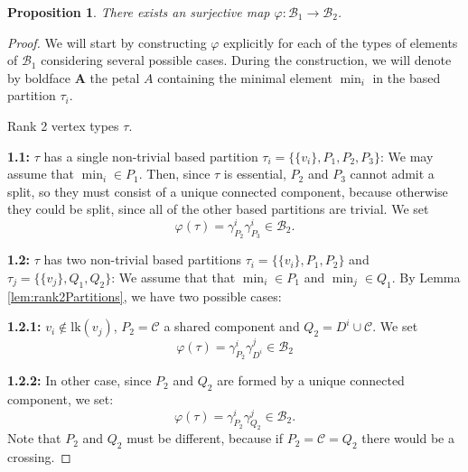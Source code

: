 \documentclass[a4paper]{amsart}
\newcommand{\B}{\mathcal{B}}
\newcommand{\C}{\mathcal{C}}
\newcommand{\lk}{\mathrm{lk}}
\newtheorem{prop}[teo]{Proposition}
\theoremstyle{definition}
\theoremstyle{remark}
\begin{document}
\begin{prop}
    There exists an surjective map   $\varphi: \B_1\rightarrow\B_2$. \label{prop:baseIsomor}
\end{prop}
\begin{proof}
We will start by  constructing $\varphi$ explicitly for each of the types of elements of $\B_1$ considering several possible cases. During the construction, we will denote by boldface  $\boldsymbol{A}$ the petal $A$ containing the minimal element $\min_i$ in the based partition $\tau_i$. 

     Rank 2 vertex types $\tau$.

     {\textbf{1.1:}} $\tau$ has a single non-trivial based partition $\tau_i=\{\{v_i\},P_1,P_2,P_3\}$:  We may assume that  $\min_i\in P_1$. Then, since $\tau$ is essential, $P_2$ and $P_3$ cannot admit a split, so they must consist of a unique connected component, because otherwise they could be split, since all of the other based partitions are trivial. We set 
        $$
        \varphi(\tau)= \gamma^i_{P_2}\gamma^i_{P_3}\in\B_2.
        $$

     
     {\textbf{1.2:}} $\tau$ has two non-trivial based partitions $\tau_i=\{\{v_i\},P_1,P_2\}$ and $\tau_j=\{\{v_j\},Q_1,Q_2\}$:
     We  assume that that $\min_i\in P_1$ and $\min_j\in Q_1$. By Lemma \ref{lem:rank2Partitions}, we have two possible cases:
        
         {\textbf{1.2.1:}}  $v_i\notin \lk(v_j)$, $P_2=\C$ a shared component and $Q_2=D^i\cup\C$. We set
         $$\varphi(\tau)= \gamma^i_{P_2}\gamma^j_{D^i}\in\B_2$$

         {\textbf{1.2.2:}} In other case, since $P_2$ and $Q_2$ are formed by a unique connected component, we set:
        $$\varphi(\tau)= \gamma^i_{P_2}\gamma^j_{Q_2}\in\B_2.$$
        Note that $P_2$ and $Q_2$ must be different, because if $P_2=\C=Q_2$ there would be a crossing.

         


\end{proof}
\end{document}
